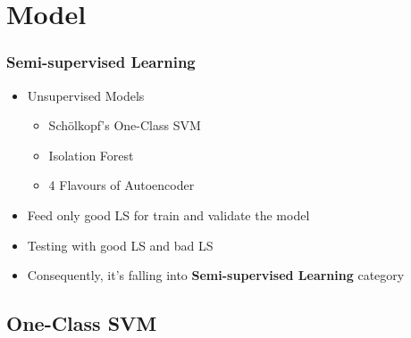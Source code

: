 \documentclass{beamer}
\begin{document}
\section{Model} %

\begin{frame}
\frametitle{Semi-supervised Learning}
\begin{itemize}
    \item Unsupervised Models
    \begin{itemize}
        \item Sch\"{o}lkopf's One-Class SVM
        \item Isolation Forest
        \item 4 Flavours of Autoencoder
    \end{itemize}
    \item Feed only good LS for train and validate the model
    \item Testing with good LS and bad LS
    \item Consequently, it's falling into \textbf{Semi-supervised Learning} category
\end{itemize}
\end{frame}
    
\subsection{One-Class SVM}
\end{document}
